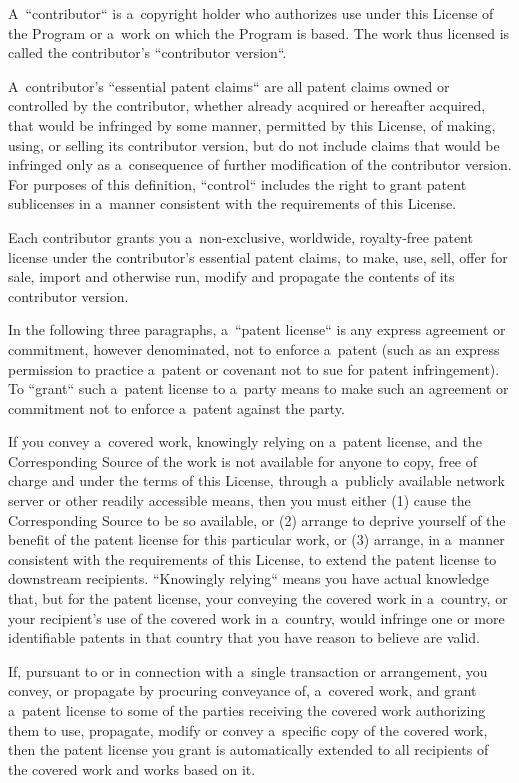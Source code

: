 \documentclass[a4paper, 11pt, twoside]{article}
\begin{document}
A~“contributor“ is a~copyright holder who authorizes use under this License of the Program or a~work on which the Program is based. The work thus licensed is called the contributor's “contributor version“.

A~contributor's “essential patent claims“ are all patent claims owned or controlled by the contributor, whether already acquired or hereafter acquired, that would be infringed by some manner, permitted by this License, of making, using, or selling its contributor version, but do not include claims that would be infringed only as a~consequence of further modification of the contributor version. For purposes of this definition, “control“ includes the right to grant patent sublicenses in a~manner consistent with the requirements of this License.

Each contributor grants you a~non-exclusive, worldwide, royalty-free patent license under the contributor's essential patent claims, to make, use, sell, offer for sale, import and otherwise run, modify and propagate the contents of its contributor version.

In the following three paragraphs, a~“patent license“ is any express agreement or commitment, however denominated, not to enforce a~patent (such as an express permission to practice a~patent or covenant not to sue for patent infringement). To “grant“ such a~patent license to a~party means to make such an agreement or commitment not to enforce a~patent against the party.

If you convey a~covered work, knowingly relying on a~patent license, and the Corresponding Source of the work is not available for anyone to copy, free of charge and under the terms of this License, through a~publicly available network server or other readily accessible means, then you must either (1) cause the Corresponding Source to be so available, or (2) arrange to deprive yourself of the benefit of the patent license for this particular work, or (3) arrange, in a~manner consistent with the requirements of this License, to extend the patent license to downstream recipients. “Knowingly relying“ means you have actual knowledge that, but for the patent license, your conveying the covered work in a~country, or your recipient's use of the covered work in a~country, would infringe one or more identifiable patents in that country that you have reason to believe are valid.

If, pursuant to or in connection with a~single transaction or arrangement, you convey, or propagate by procuring conveyance of, a~covered work, and grant a~patent license to some of the parties receiving the covered work authorizing them to use, propagate, modify or convey a~specific copy of the covered work, then the patent license you grant is automatically extended to all recipients of the covered work and works based on it.
\end{document}
